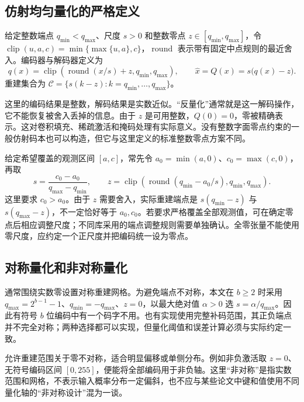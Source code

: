 \documentclass[UTF8,12pt,a4paper,fontset=fandol]{ctexart}
\begin{document}
\subsection{仿射均匀量化的严格定义}
\begin{definition}[仿射均匀量化]
给定整数端点 $q_{\min}<q_{\max}$、尺度 $s>0$ 和整数零点 $z\in[q_{\min},q_{\max}]$，令 $\operatorname{clip}(u,a,c)=\min\{\max\{u,a\},c\}$，$\operatorname{round}$ 表示带有固定中点规则的最近舍入。编码器与解码器定义为
\begin{equation}
 q(x)=\operatorname{clip}\!\left(\operatorname{round}(x/s)+z,q_{\min},q_{\max}\right),
 \qquad \widehat x=Q(x)=s\bigl(q(x)-z\bigr).
 \label{eq:quant-affine}
\end{equation}
重建集合为 $\mathcal C=\{s(k-z):k=q_{\min},\ldots,q_{\max}\}$。
\end{definition}
这里的编码结果是整数，解码结果是实数近似。“反量化”通常就是这一解码操作，它不能恢复被舍入丢掉的信息。由于 $z$ 是可用整数，$Q(0)=0$，零被精确表示。这对卷积填充、稀疏激活和掩码处理有实际意义。没有整数字面零点约束的一般仿射码本也可以构造，但它与这里定义的标准整数零点方案不同。

给定希望覆盖的观测区间 $[a,c]$，常先令 $a_0=\min(a,0)$、$c_0=\max(c,0)$，再取
\begin{equation}
 s=\frac{c_0-a_0}{q_{\max}-q_{\min}},\qquad
 z=\operatorname{clip}\!\left(\operatorname{round}(q_{\min}-a_0/s),q_{\min},q_{\max}\right).
 \label{eq:quant-minmax}
\end{equation}
这里要求 $c_0>a_0$。由于 $z$ 需要舍入，实际重建端点是 $s(q_{\min}-z)$ 与 $s(q_{\max}-z)$，不一定恰好等于 $a_0,c_0$。若要求严格覆盖全部观测值，可在确定零点后相应调整尺度；不同库采用的端点调整规则需要单独确认。全零张量不能使用零尺度，应约定一个正尺度并把编码统一设为零点。

\subsection{对称量化和非对称量化}
通常围绕实数零设置对称重建网格。为避免端点不对称，本文在 $b\geq2$ 时采用 $q_{\max}=2^{b-1}-1$、$q_{\min}=-q_{\max}$、$z=0$，以最大绝对值 $\alpha>0$ 选 $s=\alpha/q_{\max}$。因此有符号 $b$ 位编码中有一个码字不用。也有实现使用完整补码范围，其正负端点并不完全对称；两种选择都可以实现，但量化阈值和误差计算必须与实际约定一致。

允许重建范围关于零不对称，适合明显偏移或单侧分布。例如非负激活取 $z=0$、无符号编码区间 $[0,255]$，便能将全部编码用于非负轴。这里“非对称”是指实数范围和网格，不表示输入概率分布一定偏斜，也不应与某些论文中键和值使用不同量化轴的“非对称设计”混为一谈。
\end{document}
